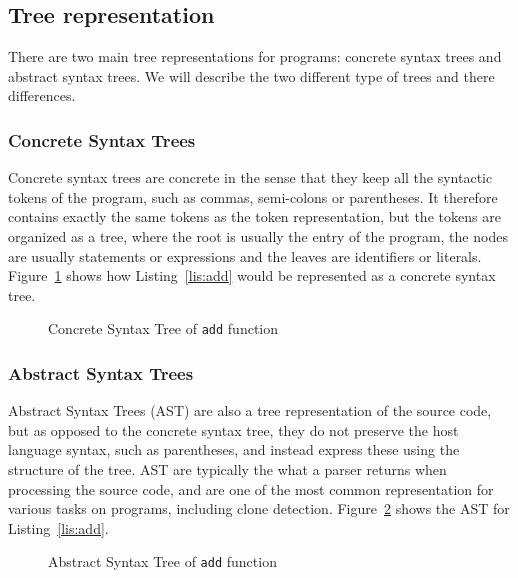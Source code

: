 \subsection{\label{ssec:tree-representation}Tree representation}
There are two main tree representations for programs: concrete syntax trees and
abstract syntax trees. We will describe the two different type of trees and
there differences.
\subsubsection{Concrete Syntax Trees}
Concrete syntax trees are concrete in the sense that they keep all the syntactic
tokens of the program, such as commas, semi-colons or parentheses. It therefore
contains exactly the same tokens as the token representation, but the tokens
are organized as a tree, where the root is usually the entry of the program,
the nodes are usually statements or expressions and the leaves are identifiers
or literals. Figure~\ref{fig:add-cst} shows how Listing~\ref{lis:add} would be
represented as a concrete syntax tree.
\begin{figure}[tb]
  \begin{center}
    \vspace*{1cm}
    \caption{\label{fig:add-cst}Concrete Syntax Tree of \lstinline{add} function}
  \end{center}
\end{figure}
\subsubsection{Abstract Syntax Trees}
Abstract Syntax Trees (AST) are also a tree representation of the source code,
but as opposed to the concrete syntax tree, they do not preserve the host
language syntax, such as parentheses, and instead express these using the
structure of the tree.
AST are typically the what a parser returns when processing the source code, and
are one of the most common representation for various tasks on programs,
including clone detection.
Figure~\ref{fig:add-ast} shows the AST for Listing~\ref{lis:add}.
\begin{figure}[tb]
  \begin{center}
    \vspace*{1cm}
    \caption{\label{fig:add-ast}Abstract Syntax Tree of \lstinline{add} function}
  \end{center}
\end{figure}
